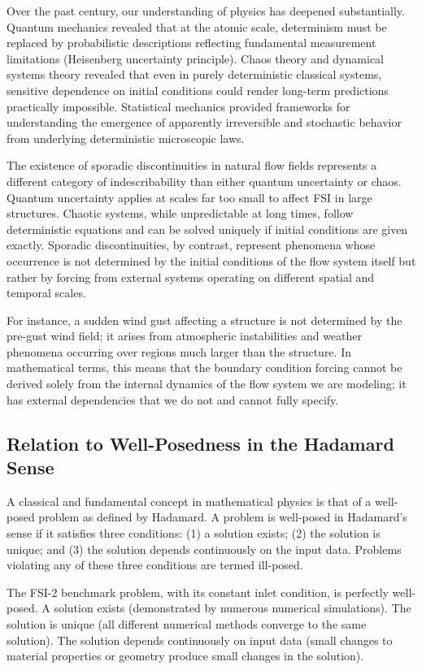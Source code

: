 ﻿\documentclass[a4paper,11pt]{article}
\theoremstyle{definition}
\begin{document}
Over the past century, our understanding of physics has deepened substantially. Quantum mechanics revealed that at the atomic scale, determinism must be replaced by probabilistic descriptions reflecting fundamental measurement limitations (Heisenberg uncertainty principle). Chaos theory and dynamical systems theory revealed that even in purely deterministic classical systems, sensitive dependence on initial conditions could render long-term predictions practically impossible. Statistical mechanics provided frameworks for understanding the emergence of apparently irreversible and stochastic behavior from underlying deterministic microscopic laws.

The existence of sporadic discontinuities in natural flow fields represents a different category of indescribability than either quantum uncertainty or chaos. Quantum uncertainty applies at scales far too small to affect FSI in large structures. Chaotic systems, while unpredictable at long times, follow deterministic equations and can be solved uniquely if initial conditions are given exactly. Sporadic discontinuities, by contrast, represent phenomena whose occurrence is not determined by the initial conditions of the flow system itself but rather by forcing from external systems operating on different spatial and temporal scales.

For instance, a sudden wind gust affecting a structure is not determined by the pre-gust wind field; it arises from atmospheric instabilities and weather phenomena occurring over regions much larger than the structure. In mathematical terms, this means that the boundary condition forcing cannot be derived solely from the internal dynamics of the flow system we are modeling; it has external dependencies that we do not and cannot fully specify.

\subsection{Relation to Well-Posedness in the Hadamard Sense}

A classical and fundamental concept in mathematical physics is that of a well-posed problem as defined by Hadamard. A problem is well-posed in Hadamard's sense if it satisfies three conditions: (1) a solution exists; (2) the solution is unique; and (3) the solution depends continuously on the input data. Problems violating any of these three conditions are termed ill-posed.

The FSI-2 benchmark problem, with its constant inlet condition, is perfectly well-posed. A solution exists (demonstrated by numerous numerical simulations). The solution is unique (all different numerical methods converge to the same solution). The solution depends continuously on input data (small changes to material properties or geometry produce small changes in the solution).
\end{document}
